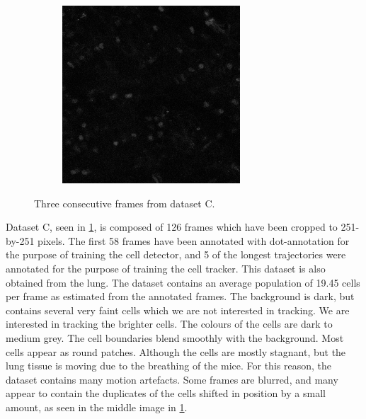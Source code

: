 \begin{figure}[h]
\begin{subfigure}{.32\textwidth}
    	\end{subfigure}
   		\hfill
  	    \begin{subfigure}{.32\textwidth}
   	  		\includegraphics[width=\textwidth]{images/series13greencropped010}
  	    \end{subfigure}
    	\caption{Three consecutive frames from dataset C.}
    	\label{fig:data_datasetC}
    \end{figure}
        
    Dataset C, seen in \cref{fig:data_datasetC}, is composed of 126 frames which have been cropped to 251-by-251 pixels. The first 58 frames have been annotated with dot-annotation for the purpose of training the cell detector, and 5 of the longest trajectories were annotated for the purpose of training the cell tracker. This dataset is also obtained from the lung. The dataset contains an average population of 19.45 cells per frame as estimated from the annotated frames. The background is dark, but contains several very faint cells which we are not interested in tracking. We are interested in tracking the brighter cells. The colours of the cells are dark to medium grey. The cell boundaries blend smoothly with the background. Most cells appear as round patches. Although the cells are mostly stagnant, but the lung tissue is moving due to the breathing of the mice. For this reason, the dataset contains many motion artefacts. Some frames are blurred, and many appear to contain the duplicates of the cells shifted in position by a small amount, as seen in the middle image in \cref{fig:data_datasetC}.

